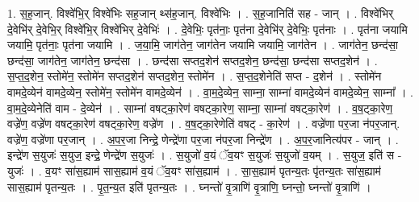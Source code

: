 \documentclass[17pt]{extarticle}
\begin{document}
1. स॒ह॒जान्. विश्वे॑भि॒र् विश्वे॑भिः सह॒जान् थ्स॑ह॒जान्. विश्वे॑भिः । . स॒ह॒जानिति॑ सह - जान् । . विश्वे॑भिर् दे॒वेभि॑र् दे॒वेभि॒र् विश्वे॑भि॒र् विश्वे॑भिर् दे॒वेभिः॑ । . दे॒वेभिः॒ पृत॑नाः॒ पृत॑ना दे॒वेभि॑र् दे॒वेभिः॒ पृत॑नाः । . पृत॑ना जयामि जयामि॒ पृत॑नाः॒ पृत॑ना जयामि । . ज॒या॒मि॒ जाग॑तेन॒ जाग॑तेन जयामि जयामि॒ जाग॑तेन । . जाग॑तेन॒ छन्द॑सा॒ छन्द॑सा॒ जाग॑तेन॒ जाग॑तेन॒ छन्द॑सा । . छन्द॑सा सप्तद॒शेन॑ सप्तद॒शेन॒ छन्द॑सा॒ छन्द॑सा सप्तद॒शेन॑ । . स॒प्त॒द॒शेन॒ स्तोमे॑न॒ स्तोमे॑न सप्तद॒शेन॑ सप्तद॒शेन॒ स्तोमे॑न । . स॒प्त॒द॒शेनेति॑ सप्त - द॒शेन॑ । . स्तोमे॑न वामदे॒व्येन॑ वामदे॒व्येन॒ स्तोमे॑न॒ स्तोमे॑न वामदे॒व्येन॑ । . वा॒म॒दे॒व्येन॒ साम्ना॒ साम्ना॑ वामदे॒व्येन॑ वामदे॒व्येन॒ साम्ना᳚ । . वा॒म॒दे॒व्येनेति॑ वाम - दे॒व्येन॑ । . साम्ना॑ वषट्का॒रेण॑ वषट्का॒रेण॒ साम्ना॒ साम्ना॑ वषट्का॒रेण॑ । . व॒ष॒ट्का॒रेण॒ वज्रे॑ण॒ वज्रे॑ण वषट्का॒रेण॑ वषट्का॒रेण॒ वज्रे॑ण । . व॒ष॒ट्का॒रेणेति॑ वषट् - का॒रेण॑ । . वज्रे॑णा पर॒जा न॑पर॒जान्. वज्रे॑ण॒ वज्रे॑णा पर॒जान् । . अ॒प॒र॒जा निन्द्रे॒ णेन्द्रे॑णा पर॒जा न॑पर॒जा निन्द्रे॑ण । . अ॒प॒र॒जानित्य॑पर - जान् । . इन्द्रे॑ण स॒युजः॑ स॒युज॒ इन्द्रे॒ णेन्द्रे॑ण स॒युजः॑ । . स॒युजो॑ व॒यं ॅव॒यꣳ स॒युजः॑ स॒युजो॑ व॒यम् । . स॒युज॒ इति॑ स - युजः॑ । . व॒यꣳ सा॑स॒ह्याम॑ सास॒ह्याम॑ व॒यं ॅव॒यꣳ सा॑स॒ह्याम॑ । . सा॒स॒ह्याम॑ पृतन्य॒तः पृ॑तन्य॒तः सा॑स॒ह्याम॑ सास॒ह्याम॑ पृतन्य॒तः । . पृ॒त॒न्य॒त इति॑ पृतन्य॒तः । . घ्नन्तो॑ वृ॒त्राणि॑ वृ॒त्राणि॒ घ्नन्तो॒ घ्नन्तो॑ वृ॒त्राणि॑ । \newline
\end{document}

